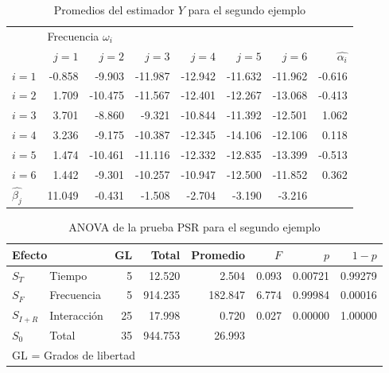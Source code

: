 \documentclass[12pt,letterpaper]{book}
\begin{document}
\begin{table}
\caption{Promedios del estimador $Y$ para el segundo ejemplo}
\centering
\begin{tabular}{lrrrrrrr}
\toprule
      & \multicolumn{6}{l}{Frecuencia $\omega_i$} \\
\cmidrule{2-7}
      & $j=1$  & $j=2$   & $j=3$   & $j=4$   & $j=5$   & $j=6$   & $\widehat{\alpha_i}$ \\ 
\midrule
$i=1$ & -0.858 & -9.903  & -11.987 & -12.942 & -11.632 & -11.962 & -0.616 \\
$i=2$ & 1.709  & -10.475 & -11.567 & -12.401 & -12.267 & -13.068 & -0.413 \\
$i=3$ & 3.701  & -8.860  & -9.321  & -10.844 & -11.392 & -12.501 & 1.062  \\
$i=4$ & 3.236  & -9.175  & -10.387 & -12.345 & -14.106 & -12.106 & 0.118  \\
$i=5$ & 1.474  & -10.461 & -11.116 & -12.332 & -12.835 & -13.399 & -0.513 \\
$i=6$ & 1.442  & -9.301  & -10.257 & -10.947 & -12.500 & -11.852 & 0.362  \\
$\widehat{\beta_j}$
     & 11.049 & -0.431  & -1.508  & -2.704  & -3.190  & -3.216  &         \\
\bottomrule
\end{tabular}
\label{tab:valores_psr_2}
\end{table}

\begin{table}
\centering
\caption{ANOVA de la prueba PSR para el segundo ejemplo}
\begin{tabular}{llrrrrrr}
\toprule
\multicolumn{2}{l}{Efecto}
                        & GL & Total   & Promedio & $F$   & $p$     & $1-p$   \\
\midrule
$S_T$     & Tiempo      & 5  & 12.520  & 2.504   & 0.093 & 0.00721 & 0.99279 \\
$S_F$     & Frecuencia  & 5  & 914.235 & 182.847 & 6.774 & 0.99984 & 0.00016 \\
$S_{I+R}$ & Interacción & 25 & 17.998  & 0.720   & 0.027 & 0.00000 & 1.00000 \\
$S_0$     & Total       & 35 & 944.753 & 26.993  &       &         &         \\
\bottomrule
\multicolumn{5}{l}{GL = Grados de libertad}
\end{tabular}
\label{tab:ejemplo_gl_2}
\end{table}

\end{document}
